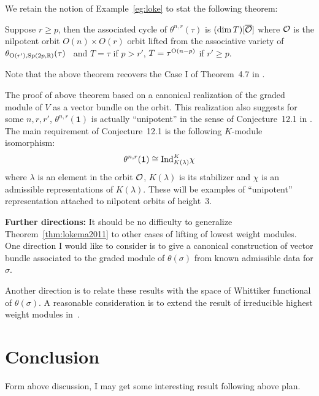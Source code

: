 \documentclass{amsart}
\begin{document}
We retain the notion of Example~\ref{eg:loke} to stat the following theorem:
\begin{thm} \label{thm:lokema2011}
Suppose $r\geq p$, then the associated cycle of $\theta^{n,r}(\tau)$ is 
$(\dim T)[\overline{\mathcal{O}}]$ where $\mathcal{O}$ is the nilpotent orbit $O(n)\times O(r)$ orbit lifted from the associative
variety of $\theta_{{\rm O}(r'),{\rm Sp}(2p,{\mathbb{R}})}(\tau)$~\cite{NishyamaZhu2004} 
and $T= \tau$ if $p>r'$, $T=\tau^{{\rm O}(n-p)}$ if $r'\geq p$.  
\end{thm}
Note that the above theorem recovers the Case I of Theorem~4.7 in \cite{NishyamaZhu2004}.

The proof of above theorem based on a canonical realization of the
graded module of $V$ as a vector bundle on the orbit. This realization
also suggests for some  $n,r,r'$,  $\theta^{n,r}(\mathbf{1})$ is
actually ``unipotent''  in the sense of Conjecture~12.1 in
\cite{Vogan1989Var}. The main requirement of Conjecture~12.1 is the
following $K$-module isomorphism:
 \[
\theta^{n,r}(\mathbf{1})\cong {\rm Ind}_{K(\lambda)}^K\chi
\]
where $\lambda$ is an element in the orbit $\mathcal{O}$, $K(\lambda)$ is its
stabilizer and 
$\chi$ is an  admissible representations of $K(\lambda)$.
These will be examples of ``unipotent'' representation attached to
nilpotent orbits of height~3. 



{\bf Further directions:} It should be no difficulty to generalize Theorem~\ref{thm:lokema2011}
to other cases of lifting of lowest weight modules. One direction I would like to consider
is to give a canonical construction of vector bundle associated to
the graded module of $\theta(\sigma)$ from known admissible data for $\sigma$.

Another direction is to relate these results with the space of
Whittiker functional of $\theta(\sigma)$. A reasonable consideration
is to extend the result of irreducible highest weight modules in~\cite{Yamashita2001cayley}.

\section{Conclusion}
Form above discussion, I may get some interesting result following above plan.

{}

\end{document}

